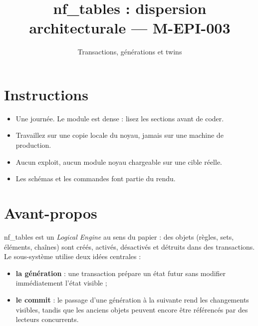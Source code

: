 \documentclass{training}
\begin{document}
\title{nf\_tables : dispersion architecturale --- M-EPI-003}
\subtitle{Transactions, générations et twins}
\maketitle

\newpage
\tableofcontents
\newpage

\chapter{Instructions}
\begin{itemize}
  \item Une journée. Le module est dense : lisez les sections avant de coder.
  \item Travaillez sur une copie locale du noyau, jamais sur une machine de production.
  \item Aucun exploit, aucun module noyau chargeable sur une cible réelle.
  \item Les schémas et les commandes font partie du rendu.
\end{itemize}





\chapter{Avant-propos}

nf\_tables est un \emph{Logical Engine} au sens du papier : des objets
(règles, sets, éléments, chaînes) sont créés, activés, désactivés et
détruits dans des transactions. Le sous-système utilise deux idées
centrales :

\begin{itemize}
  \item \textbf{la génération} : une transaction prépare un état futur sans
        modifier immédiatement l'état visible ;
  \item \textbf{le commit} : le passage d'une génération à la suivante rend
        les changements visibles, tandis que les anciens objets peuvent
        encore être référencés par des lecteurs concurrents.
\end{itemize}
\end{document}
